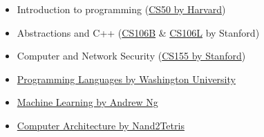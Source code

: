 \documentclass[10pt,a4paper]{../altacv}
\begin{document}
\begin{itemize}
	\item Introduction to programming (\href{https://cs50.harvard.edu/}{CS50 by Harvard})
	\item Abstractions and C++ (\href{https://web.stanford.edu/class/cs106b/}{CS106B} \& \href{http://web.stanford.edu/class/cs106l/index.html}{CS106L} by Stanford)
	\item Computer and Network Security (\href{https://crypto.stanford.edu/cs155/}{CS155 by Stanford})
\end{itemize}

\divider

\begin{itemize}
	\item \href{https://www.coursera.org/instructor/~873260}{Programming Languages by Washington University}
	\item \href{https://www.coursera.org/learn/machine-learning}{Machine Learning by Andrew Ng}
	\item \href{http://nand2tetris.org/}{Computer Architecture by Nand2Tetris}
\end{itemize}

\medskip










\end{document}
